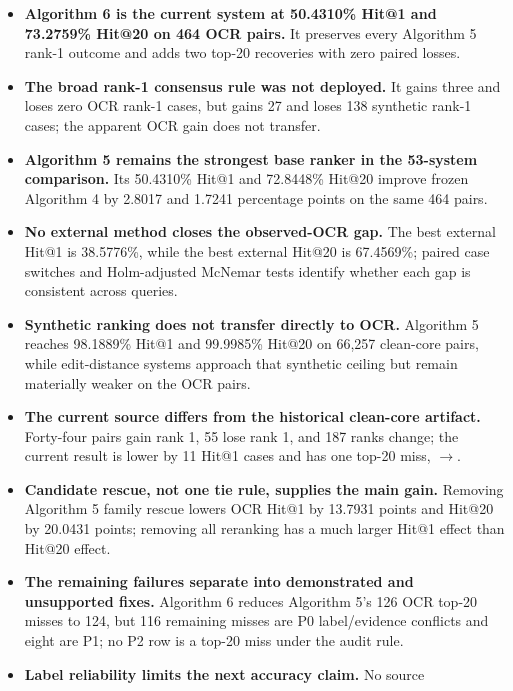 \documentclass[11pt,a4paper]{article}
\newcommand{\code}[1]{\texttt{\detokenize{#1}}}
\begin{document}
\begin{itemize}
  \item \textbf{Algorithm 6 is the current system at 50.4310\% Hit@1 and
        73.2759\% Hit@20 on 464 OCR pairs.} It preserves every Algorithm 5
        rank-1 outcome and adds two top-20 recoveries with zero paired losses.
  \item \textbf{The broad rank-1 consensus rule was not deployed.} It gains
        three and loses zero OCR rank-1 cases, but gains 27 and loses 138
        synthetic rank-1 cases; the apparent OCR gain does not transfer.
  \item \textbf{Algorithm 5 remains the strongest base ranker in the
        53-system comparison.} Its 50.4310\% Hit@1 and 72.8448\% Hit@20 improve
        frozen Algorithm 4 by 2.8017 and 1.7241 percentage points on the same
        464 pairs.
  \item \textbf{No external method closes the observed-OCR gap.} The best
        external Hit@1 is 38.5776\%, while the best external Hit@20 is
        67.4569\%; paired case switches and Holm-adjusted McNemar tests identify
        whether each gap is consistent across queries.
  \item \textbf{Synthetic ranking does not transfer directly to OCR.}
        Algorithm 5 reaches 98.1889\% Hit@1 and 99.9985\% Hit@20 on 66,257
        clean-core pairs, while edit-distance systems approach that synthetic
        ceiling but remain materially weaker on the OCR pairs.
  \item \textbf{The current source differs from the historical clean-core
        artifact.} Forty-four pairs gain rank 1, 55 lose rank 1, and 187 ranks
        change; the current result is lower by 11 Hit@1 cases and has one
        top-20 miss, \code{aclox}$\rightarrow$\code{ADOX}.
  \item \textbf{Candidate rescue, not one tie rule, supplies the main gain.}
        Removing Algorithm 5 family rescue lowers OCR Hit@1 by 13.7931 points
        and Hit@20 by 20.0431 points; removing all reranking has a much larger
        Hit@1 effect than Hit@20 effect.
  \item \textbf{The remaining failures separate into demonstrated and
        unsupported fixes.} Algorithm 6 reduces Algorithm 5's 126 OCR top-20
        misses to 124, but 116 remaining misses are P0 label/evidence conflicts
        and eight are P1; no P2 row is a top-20 miss under the audit rule.
  \item \textbf{Label reliability limits the next accuracy claim.} No source

\end{itemize}
\end{document}
